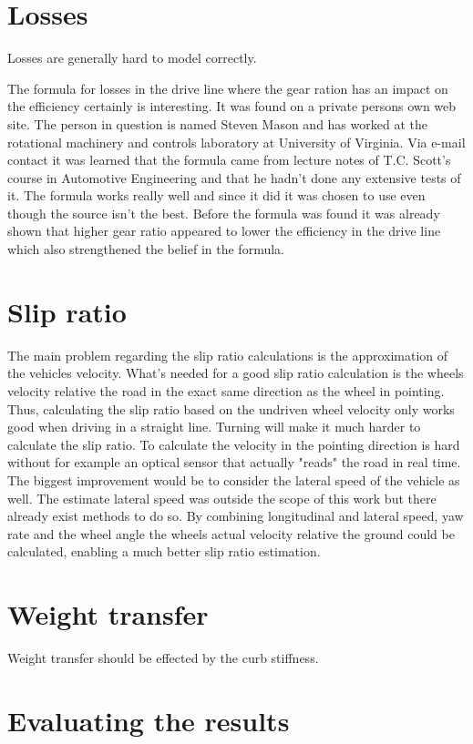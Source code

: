 \section{Losses}
Losses are generally hard to model correctly.

The formula for losses in the drive line where the gear ration has an impact on the efficiency certainly is interesting. It was found on a private persons own web site. The person in question is named Steven Mason and has worked at the rotational machinery and controls laboratory at University of Virginia. Via e-mail contact it was learned that the formula came from lecture notes of T.C. Scott's course in Automotive Engineering and that he hadn't done any extensive tests of it. The formula works really well and since it did it was chosen to use even though the source isn't the best. Before the formula was found it was already shown that higher gear ratio appeared to lower the efficiency in the drive line which also strengthened the belief in the formula. 

\section{Slip ratio}
The main problem regarding the slip ratio calculations is the approximation of the vehicles velocity. What's needed for a good slip ratio calculation is the wheels velocity relative the road in the exact same direction as the wheel in pointing. Thus, calculating the slip ratio based on the undriven wheel velocity only works good when driving in a straight line. Turning will make it much harder to calculate the slip ratio. To calculate the velocity in the pointing direction is hard without for example an optical sensor that actually "reads" the road in real time. The biggest improvement would be to consider the lateral speed of the vehicle as well. The estimate lateral speed was outside the scope of this work but there already exist methods to do so. By combining longitudinal and lateral speed, yaw rate and the wheel angle the wheels actual velocity relative the ground could be calculated, enabling a much better slip ratio estimation.


\section{Weight transfer}
Weight transfer should be effected by the curb stiffness. 


\section{Evaluating the results}

